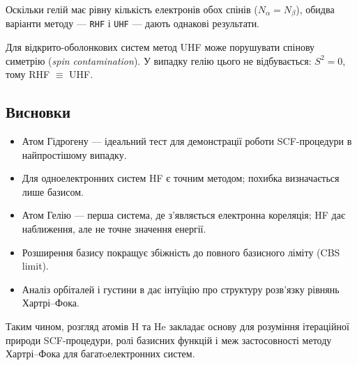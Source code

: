 Оскільки гелій має рівну кількість електронів обох спінів (\(N_\alpha = N_\beta\)), обидва варіанти методу --- \texttt{RHF} і \texttt{UHF} --- дають однакові результати.


\begin{commentbox}
Для відкрито-оболонкових систем метод UHF може порушувати спінову симетрію (\textit{spin contamination}).
У випадку гелію цього не відбувається: $S^2 = 0$, тому RHF $\equiv$ UHF.
\end{commentbox}



\subsection{Висновки}

\begin{itemize}
    \item Атом Гідрогену --- ідеальний тест для демонстрації роботи SCF-процедури в найпростішому випадку.
    \item Для одноелектронних систем HF є точним методом; похибка визначається лише базисом.
    \item Атом Гелію --- перша система, де з’являється електронна кореляція; HF дає наближення, але не точне значення енергії.
    \item Розширення базису покращує збіжність до повного базисного ліміту (CBS limit).
    \item Аналіз орбіталей і густини в \PySCF{} дає інтуїцію про структуру розв’язку рівнянь Хартрі–Фока.
\end{itemize}

Таким чином, розгляд атомів H та He закладає основу для розуміння ітераційної природи SCF-процедури, ролі базисних функцій і меж застосовності методу Хартрі–Фока для багатoелектронних систем.
